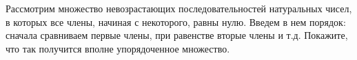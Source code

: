 Рассмотрим множество невозрастающих последовательностей натуральных чисел, в которых все члены, начиная с
некоторого, равны нулю. Введем в нем порядок: сначала сравниваем первые члены, при равенстве вторые члены
и т.д. Покажите, что так получится вполне упорядоченное множество.
